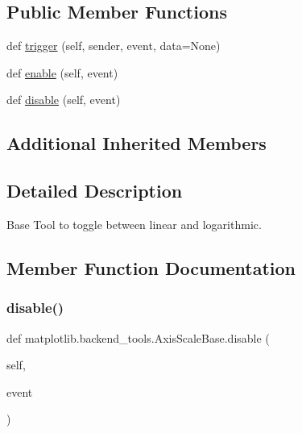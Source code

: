 \subsection*{Public Member Functions}
\begin{DoxyCompactItemize}
\item 
def \hyperlink{classmatplotlib_1_1backend__tools_1_1AxisScaleBase_a49c0ad75b0debd196e4f44c72e339789}{trigger} (self, sender, event, data=None)
\item 
def \hyperlink{classmatplotlib_1_1backend__tools_1_1AxisScaleBase_ab0037adc90826a0d904cf1069e58023a}{enable} (self, event)
\item 
def \hyperlink{classmatplotlib_1_1backend__tools_1_1AxisScaleBase_a27196341afadb68cb2fb3ec6c01029ee}{disable} (self, event)
\end{DoxyCompactItemize}
\subsection*{Additional Inherited Members}


\subsection{Detailed Description}
\begin{DoxyVerb}Base Tool to toggle between linear and logarithmic.\end{DoxyVerb}
 

\subsection{Member Function Documentation}
\mbox{\label{classmatplotlib_1_1backend__tools_1_1AxisScaleBase_a27196341afadb68cb2fb3ec6c01029ee}} 
\subsubsection{\texorpdfstring{disable()}{disable()}}
{\footnotesize\ttfamily def matplotlib.\+backend\+\_\+tools.\+Axis\+Scale\+Base.\+disable (\begin{DoxyParamCaption}\item[{}]{self,  }\item[{}]{event }\end{DoxyParamCaption})}


